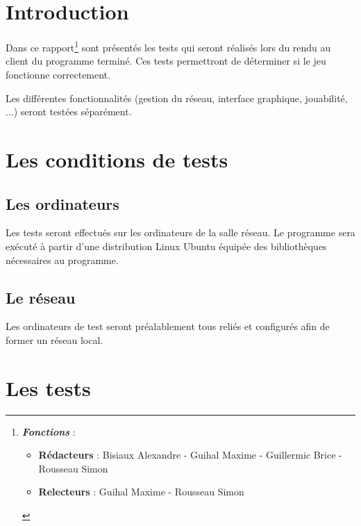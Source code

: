 \section*{Introduction}

Dans ce rapport\footnote{\textit{\textbf{Fonctions}} :
\begin{itemize}
\item \textbf{Rédacteurs} : Bisiaux Alexandre - Guihal Maxime - Guillermic Brice - Rousseau Simon
\item \textbf{Relecteurs} : Guihal Maxime - Rousseau Simon
\end{itemize}
} sont présentés les tests qui seront réalisés lors du rendu au client du programme terminé. Ces tests permettront de déterminer si le jeu fonctionne correctement.

\vspace{0.5cm}

Les différentes fonctionnalités (gestion du réseau, interface graphique, jouabilité, ...) seront testées séparément.

\newpage

\section{Les conditions de tests}


\subsection{Les ordinateurs}

Les tests seront effectués sur les ordinateurs de la salle réseau. Le programme sera exécuté à partir d'une distribution Linux Ubuntu équipée des bibliothèques nécessaires au programme.

\subsection{Le réseau}

Les ordinateurs de test seront préalablement tous reliés et configurés afin de former un réseau local.


\section{Les tests}

